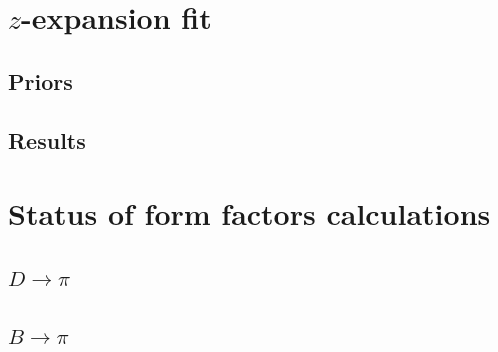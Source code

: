 \section{$z$-expansion fit}\label{sec:Hpi_zfit}

\subsection{Priors}\label{sec:Hpi_zfit_priors}

\subsection{Results}\label{sec:Hpi_zfit_results}

\section{Status of form factors calculations}\label{sec:Hpi_FF_status}

\subsection{$D\rightarrow\pi$}\label{sec:Dpi_status}

\subsection{$B\rightarrow\pi$}\label{sec:Hpi_status}